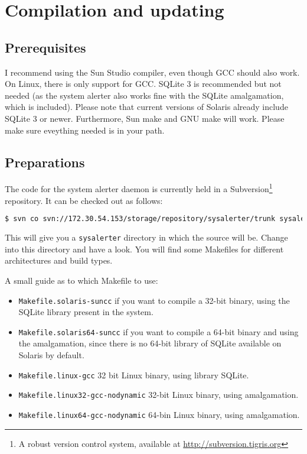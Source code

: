 \documentclass[a4paper,10pt,titlepage]{book}
\begin{document}
\section{Compilation and updating}

\subsection{Prerequisites}

I recommend using the Sun Studio compiler, even though GCC should also work. On Linux, there is only support for GCC. SQLite 3 is recommended but not needed (as the system alerter also works fine with the SQLite amalgamation, which is included). Please note that current versions of Solaris already include SQLite 3 or newer. Furthermore, Sun make and GNU make will work. Please make sure eveything needed is in your path.

\subsection{Preparations}

The code for the system alerter daemon is currently held in a Subversion\footnote{A robust version control system, available at \url{http://subversion.tigris.org}} repository. It can be checked out as follows:

\begin{lstlisting}[language=bash,breaklines=true]
$ svn co svn://172.30.54.153/storage/repository/sysalerter/trunk sysalerter
\end{lstlisting}

This will give you a \texttt{sysalerter} directory in which the source will be. Change into this directory and have a look. You will find some Makefiles for different architectures and build types. 

A small guide as to which Makefile to use:
\begin{itemize}
 \item \texttt{Makefile.solaris-suncc} if you want to compile a 32-bit binary, using the SQLite library present in the system.
 \item \texttt{Makefile.solaris64-suncc} if you want to compile a 64-bit binary and using the amalgamation, since there is no 64-bit library of SQLite available on Solaris by default.
 \item \texttt{Makefile.linux-gcc} 32 bit Linux binary, using library SQLite.
 \item \texttt{Makefile.linux32-gcc-nodynamic} 32-bit Linux binary, using amalgamation.
 \item \texttt{Makefile.linux64-gcc-nodynamic} 64-bin Linux binary, using amalgamation.
\end{itemize}
\end{document}

